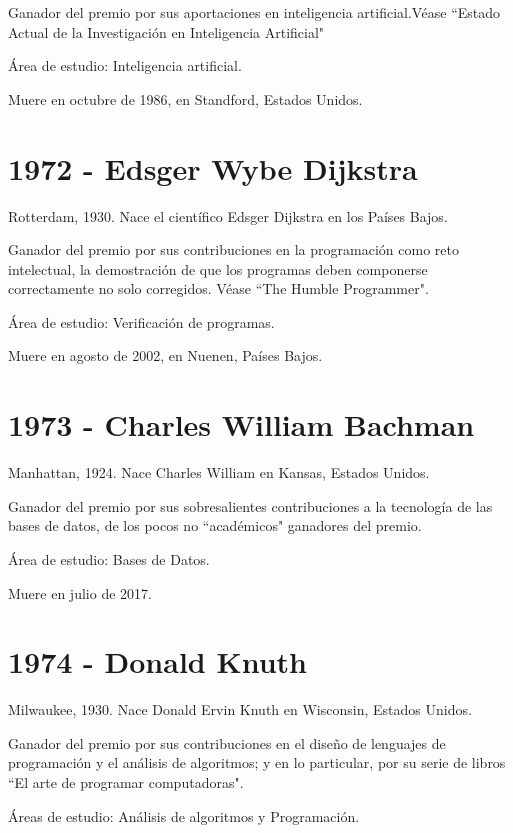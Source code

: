\documentclass[notitlepage,letterpaper, 11pt]{article}
\begin{document}
\noindent Ganador del premio por sus aportaciones en inteligencia artificial.Véase ``Estado Actual de la Investigación en Inteligencia Artificial"

\noindent Área de estudio: Inteligencia artificial.

\noindent Muere en octubre de 1986, en Standford, Estados Unidos.
\newline

\section*{1972 - Edsger Wybe Dijkstra}
\noindent Rotterdam, 1930. Nace el científico Edsger Dijkstra en los Países Bajos.

\noindent Ganador del premio por sus contribuciones en la programación como reto intelectual, la demostración de que los programas deben componerse correctamente no solo corregidos. Véase ``The Humble Programmer".

\noindent Área de estudio: Verificación de programas.

\noindent Muere en agosto de 2002, en Nuenen, Países Bajos.
\newline

\section*{1973 - Charles William Bachman}
\noindent Manhattan, 1924. Nace Charles William en Kansas, Estados Unidos.

\noindent Ganador del premio por sus sobresalientes contribuciones a la tecnología de las bases de datos, de los pocos no ``académicos" ganadores del premio.

\noindent Área de estudio: Bases de Datos.

\noindent Muere en julio de 2017.
\newline

\section*{1974 - Donald Knuth}
\noindent Milwaukee, 1930. Nace Donald Ervin Knuth en Wisconsin, Estados Unidos.

\noindent Ganador del premio por sus contribuciones en el diseño de lenguajes de programación y el análisis de algoritmos; y en lo particular, por su serie de libros ``El arte de programar computadoras".

\noindent Áreas de estudio: Análisis de algoritmos y Programación.
\newline
\end{document}
